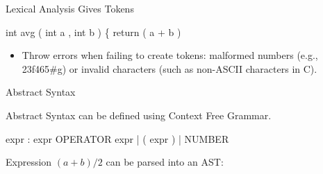 \documentclass{plt}
\begin{document}
\begin{frame}[fragile]{Lexical Analysis Gives Tokens}
\usebox{\gcdbox}\hfill

\renewcommand{\baselinestretch}{2}

{\ttfamily
\tokens int avg ( int a , int b
\tokens ) \{ return ( a + b )
\token{/}  
\token{;} \token{\}}\par
}

\renewcommand{\baselinestretch}{1}

\begin{itemize}
\item Throw errors when failing to create tokens:  malformed numbers (e.g., \alert{23f465\#g}) or 
invalid characters (such as \alert{non-ASCII characters} in C).
\end{itemize}

\end{frame}


\newcommand{\id}[1]{
  node [fill=gray!15] {#1}
}

\begin{frame}[fragile,t]{Abstract Syntax}

Abstract Syntax can be defined using \alert{Context Free Grammar}.

\begin{ocamlyacc}
expr :
    expr OPERATOR expr  
  | ( expr )
  | NUMBER          
\end{ocamlyacc}

Expression $ (a + b) / 2$ can be parsed into an \alert{AST}:
\begin{center}
\end{center}
\end{frame}
\end{document}
